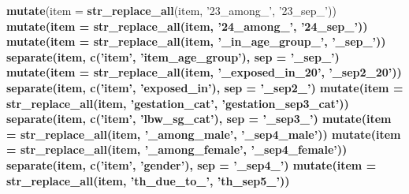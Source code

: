 \documentclass[]{article}
\newenvironment{Shaded}{\begin{snugshade}}{\end{snugshade}}
\newcommand{\DataTypeTok}[1]{\textcolor[rgb]{0.13,0.29,0.53}{#1}}
\newcommand{\KeywordTok}[1]{\textcolor[rgb]{0.13,0.29,0.53}{\textbf{#1}}}
\newcommand{\NormalTok}[1]{#1}
\newcommand{\OperatorTok}[1]{\textcolor[rgb]{0.81,0.36,0.00}{\textbf{#1}}}
\newcommand{\StringTok}[1]{\textcolor[rgb]{0.31,0.60,0.02}{#1}}
\begin{document}
\begin{Shaded}
\begin{Highlighting}[]
{{{{{{{{{{{{{{\StringTok{  }\KeywordTok{mutate}\NormalTok{(}\DataTypeTok{item =} \KeywordTok{str_replace_all}\NormalTok{(item, }\StringTok{'23_among_'}\NormalTok{, }\StringTok{'23_sep_'}\NormalTok{)) }\OperatorTok{%>%}\StringTok{ }
\StringTok{  }\KeywordTok{mutate}\NormalTok{(}\DataTypeTok{item =} \KeywordTok{str_replace_all}\NormalTok{(item, }\StringTok{'24_among_'}\NormalTok{, }\StringTok{'24_sep_'}\NormalTok{)) }\OperatorTok{%>%}\StringTok{ }
\StringTok{  }\KeywordTok{mutate}\NormalTok{(}\DataTypeTok{item =} \KeywordTok{str_replace_all}\NormalTok{(item, }\StringTok{'_in_age_group_'}\NormalTok{, }\StringTok{'_sep_'}\NormalTok{)) }\OperatorTok{%>%}
\StringTok{  }\KeywordTok{separate}\NormalTok{(item, }
           \KeywordTok{c}\NormalTok{(}\StringTok{'item'}\NormalTok{, }\StringTok{'item_age_group'}\NormalTok{), }
           \DataTypeTok{sep =} \StringTok{'_sep_'}\NormalTok{) }\OperatorTok{%>%}\StringTok{ }
\StringTok{  }\KeywordTok{mutate}\NormalTok{(}\DataTypeTok{item =} \KeywordTok{str_replace_all}\NormalTok{(item, }\StringTok{'_exposed_in_20'}\NormalTok{, }\StringTok{'_sep2_20'}\NormalTok{))}\OperatorTok{%>%}\StringTok{ }
\StringTok{  }\KeywordTok{separate}\NormalTok{(item, }
           \KeywordTok{c}\NormalTok{(}\StringTok{'item'}\NormalTok{, }\StringTok{'exposed_in'}\NormalTok{), }
           \DataTypeTok{sep =} \StringTok{'_sep2_'}\NormalTok{) }\OperatorTok{%>%}\StringTok{  }
\StringTok{  }\KeywordTok{mutate}\NormalTok{(}\DataTypeTok{item =} \KeywordTok{str_replace_all}\NormalTok{(item, }\StringTok{'gestation_cat'}\NormalTok{, }\StringTok{'gestation_sep3_cat'}\NormalTok{))   }\OperatorTok{%>%}\StringTok{ }
\StringTok{  }\KeywordTok{separate}\NormalTok{(item, }
           \KeywordTok{c}\NormalTok{(}\StringTok{'item'}\NormalTok{, }\StringTok{'lbw_sg_cat'}\NormalTok{), }
           \DataTypeTok{sep =} \StringTok{'_sep3_'}\NormalTok{) }\OperatorTok{%>%}
\StringTok{  }\KeywordTok{mutate}\NormalTok{(}\DataTypeTok{item =} \KeywordTok{str_replace_all}\NormalTok{(item, }\StringTok{'_among_male'}\NormalTok{, }\StringTok{'_sep4_male'}\NormalTok{)) }\OperatorTok{%>%}\StringTok{ }
\StringTok{  }\KeywordTok{mutate}\NormalTok{(}\DataTypeTok{item =} \KeywordTok{str_replace_all}\NormalTok{(item, }\StringTok{'_among_female'}\NormalTok{, }\StringTok{'_sep4_female'}\NormalTok{)) }\OperatorTok{%>%}\StringTok{ }
\StringTok{  }\KeywordTok{separate}\NormalTok{(item, }
           \KeywordTok{c}\NormalTok{(}\StringTok{'item'}\NormalTok{, }\StringTok{'gender'}\NormalTok{), }
           \DataTypeTok{sep =} \StringTok{'_sep4_'}\NormalTok{) }\OperatorTok{%>%}\StringTok{ }
\StringTok{  }\KeywordTok{mutate}\NormalTok{(}\DataTypeTok{item =} \KeywordTok{str_replace_all}\NormalTok{(item, }\StringTok{'th_due_to_'}\NormalTok{, }\StringTok{'th_sep5_'}\NormalTok{)) }\OperatorTok{%>%}\StringTok{ }
}}}}}}}}}}}}}}}}}}}}}}}}}}
\end{Highlighting}
\end{Shaded}
\end{document}
